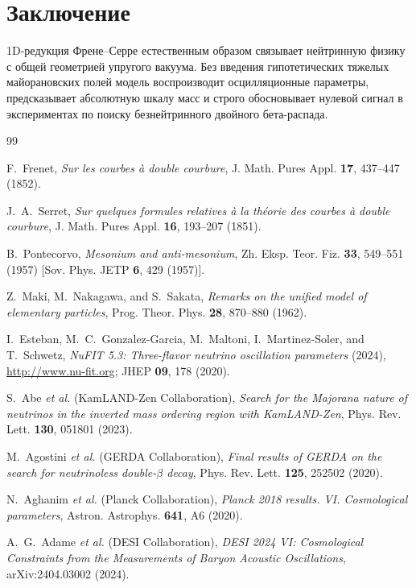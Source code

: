 \documentclass[11pt,a4paper]{article}
\theoremstyle{definition}
\theoremstyle{remark}
\begin{document}
\section{Заключение}
1D-редукция Френе--Серре естественным образом связывает нейтринную физику с общей геометрией упругого вакуума. Без введения гипотетических тяжелых майорановских полей модель воспроизводит осцилляционные параметры, предсказывает абсолютную шкалу масс и строго обосновывает нулевой сигнал в экспериментах по поиску безнейтринного двойного бета-распада.

\begin{thebibliography}{99}

F.~Frenet, \textit{Sur les courbes {\`a} double courbure}, J. Math. Pures Appl. \textbf{17}, 437--447 (1852).

J.~A.~Serret, \textit{Sur quelques formules relatives {\`a} la th{\'e}orie des courbes {\`a} double courbure}, J. Math. Pures Appl. \textbf{16}, 193--207 (1851).

B.~Pontecorvo, \textit{Mesonium and anti-mesonium}, Zh. Eksp. Teor. Fiz. \textbf{33}, 549--551 (1957) [Sov. Phys. JETP \textbf{6}, 429 (1957)].

Z.~Maki, M.~Nakagawa, and S.~Sakata, \textit{Remarks on the unified model of elementary particles}, Prog. Theor. Phys. \textbf{28}, 870--880 (1962).

I.~Esteban, M.~C.~Gonzalez-Garcia, M.~Maltoni, I.~Martinez-Soler, and T.~Schwetz, \textit{NuFIT 5.3: Three-flavor neutrino oscillation parameters} (2024), \url{http://www.nu-fit.org}; JHEP \textbf{09}, 178 (2020).

S.~Abe \textit{et al.} (KamLAND-Zen Collaboration), \textit{Search for the Majorana nature of neutrinos in the inverted mass ordering region with KamLAND-Zen}, Phys. Rev. Lett. \textbf{130}, 051801 (2023).

M.~Agostini \textit{et al.} (GERDA Collaboration), \textit{Final results of GERDA on the search for neutrinoless double-$\beta$ decay}, Phys. Rev. Lett. \textbf{125}, 252502 (2020).

N.~Aghanim \textit{et al.} (Planck Collaboration), \textit{Planck 2018 results. VI. Cosmological parameters}, Astron. Astrophys. \textbf{641}, A6 (2020).

A.~G.~Adame \textit{et al.} (DESI Collaboration), \textit{DESI 2024 VI: Cosmological Constraints from the Measurements of Baryon Acoustic Oscillations}, arXiv:2404.03002 (2024).

\end{thebibliography}
\end{document}
